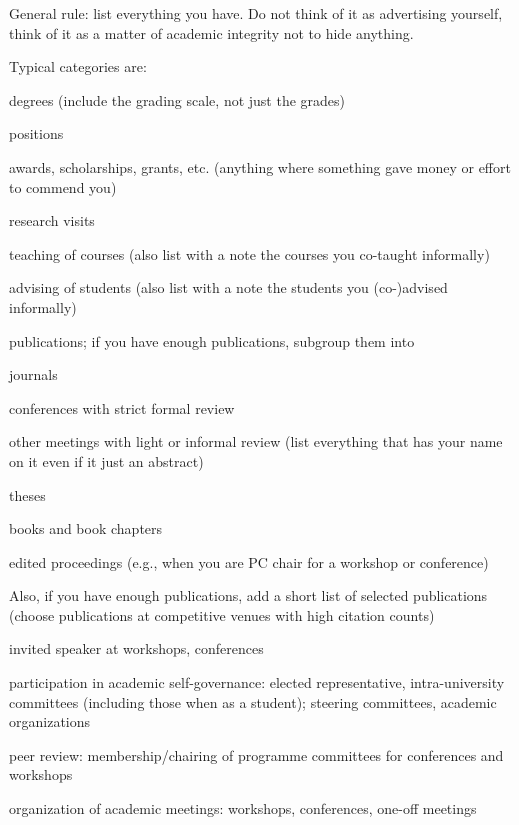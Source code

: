 \documentclass[12pt]{article}
\begin{document}
General rule: list everything you have.
Do not think of it as advertising yourself, think of it as a matter of academic integrity not to hide anything.

Typical categories are:
\begin{compactitem}
 \item degrees (include the grading scale, not just the grades)
 \item positions
 \item awards, scholarships, grants, etc. (anything where something gave money or effort to commend you)
 \item research visits
 \item teaching of courses (also list with a note the courses you co-taught informally)
 \item advising of students (also list with a note the students you (co-)advised informally) 
 \item publications; if you have enough publications, subgroup them into
  \begin{compactitem}
   \item journals
   \item conferences with strict formal review
   \item other meetings with light or informal review (list everything that has your name on it even if it just an abstract)
   \item theses
   \item books and book chapters
   \item edited proceedings (e.g., when you are PC chair for a workshop or conference)
  \end{compactitem}
  Also, if you have enough publications, add a short list of selected publications (choose publications at competitive venues with high citation counts)
 \item invited speaker at workshops, conferences
 \item participation in academic self-governance: elected representative, intra-university committees (including those when as a student); steering committees, academic organizations
 \item peer review: membership/chairing of programme committees for conferences and workshops
 \item organization of academic meetings: workshops, conferences, one-off meetings
\end{compactitem}

\end{document}
